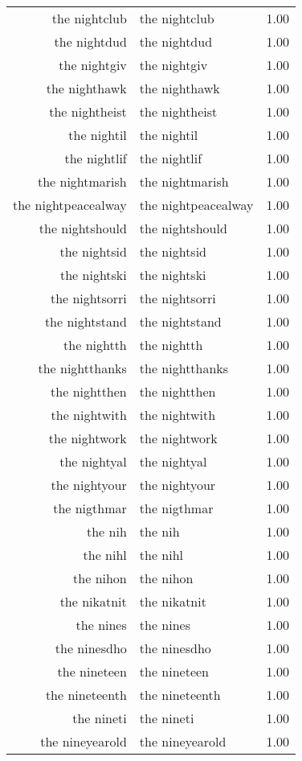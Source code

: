 \begin{table}[ht]
\begin{tabular}{rlr}
  the nightclub & the nightclub & 1.00 \\ 
  the nightdud & the nightdud & 1.00 \\ 
  the nightgiv & the nightgiv & 1.00 \\ 
  the nighthawk & the nighthawk & 1.00 \\ 
  the nightheist & the nightheist & 1.00 \\ 
  the nightil & the nightil & 1.00 \\ 
  the nightlif & the nightlif & 1.00 \\ 
  the nightmarish & the nightmarish & 1.00 \\ 
  the nightpeacealway & the nightpeacealway & 1.00 \\ 
  the nightshould & the nightshould & 1.00 \\ 
  the nightsid & the nightsid & 1.00 \\ 
  the nightski & the nightski & 1.00 \\ 
  the nightsorri & the nightsorri & 1.00 \\ 
  the nightstand & the nightstand & 1.00 \\ 
  the nightth & the nightth & 1.00 \\ 
  the nightthanks & the nightthanks & 1.00 \\ 
  the nightthen & the nightthen & 1.00 \\ 
  the nightwith & the nightwith & 1.00 \\ 
  the nightwork & the nightwork & 1.00 \\ 
  the nightyal & the nightyal & 1.00 \\ 
  the nightyour & the nightyour & 1.00 \\ 
  the nigthmar & the nigthmar & 1.00 \\ 
  the nih & the nih & 1.00 \\ 
  the nihl & the nihl & 1.00 \\ 
  the nihon & the nihon & 1.00 \\ 
  the nikatnit & the nikatnit & 1.00 \\ 
  the nines & the nines & 1.00 \\ 
  the ninesdho & the ninesdho & 1.00 \\ 
  the nineteen & the nineteen & 1.00 \\ 
  the nineteenth & the nineteenth & 1.00 \\ 
  the nineti & the nineti & 1.00 \\ 
  the nineyearold & the nineyearold & 1.00 \\ 

\end{tabular}
\end{table}
